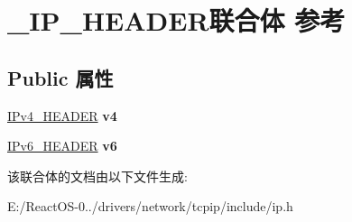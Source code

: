 \hypertarget{union___i_p___h_e_a_d_e_r}{}\section{\+\_\+\+I\+P\+\_\+\+H\+E\+A\+D\+E\+R联合体 参考}
\label{union___i_p___h_e_a_d_e_r}
\subsection*{Public 属性}
\begin{DoxyCompactItemize}
\item 
\mbox{\label{union___i_p___h_e_a_d_e_r_a82060c92536ad9eb80b7895bfb080198}} 
\hyperlink{struct_i_pv4___h_e_a_d_e_r}{I\+Pv4\+\_\+\+H\+E\+A\+D\+ER} {\bfseries v4}
\item 
\mbox{\label{union___i_p___h_e_a_d_e_r_acd46b8e287a86c70199e4acd20353736}} 
\hyperlink{struct_i_pv6___h_e_a_d_e_r}{I\+Pv6\+\_\+\+H\+E\+A\+D\+ER} {\bfseries v6}
\end{DoxyCompactItemize}


该联合体的文档由以下文件生成\+:\begin{DoxyCompactItemize}
\item 
E\+:/\+React\+O\+S-\/0../drivers/network/tcpip/include/ip.\+h\end{DoxyCompactItemize}
